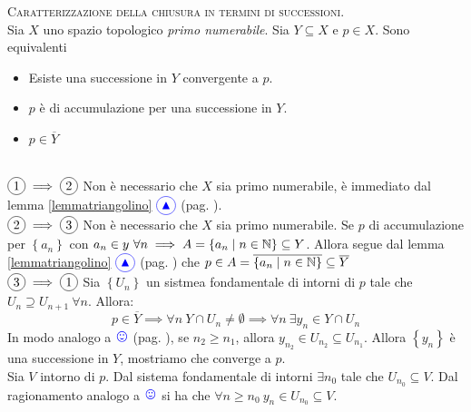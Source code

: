 \begin{proposition}
	\textsc{Caratterizzazione della chiusura in termini di successioni.}\\
	Sia $X$ uno spazio topologico \textit{primo numerabile}. Sia $Y\subseteq X$ e $p\in X$. Sono equivalenti
	\begin{itemize}
		\item Esiste una successione in $Y$ convergente a $p$.
		\item $p$ è di accumulazione per una successione in $Y$.
		\item $p\in \overline{Y}$
	\end{itemize}
\end{proposition}
\begin{demonstration}~{}\\
$\circled{1}\implies\circled{2}$ Non è necessario che $X$ sia primo numerabile, è immediato dal lemma \ref{lemmatriangolino} $\textcolor{blue}{\circled{{\large \blacktriangle}}}$ (pag. \pageref{lemmatriangolino}).\\
$\circled{2}\implies\circled{3}$ Non è necessario che $X$ sia primo numerabile. Se $p$ di accumulazione per $\left\{a_n\right\}$ con $a_n\in y\ \forall n\implies A=\left\{a_n\mid n\in \mathbb{N}\right\}\subseteq Y$. Allora segue dal lemma \ref{lemmatriangolino} $\textcolor{blue}{\circled{{\large \blacktriangle}}}$ (pag. \pageref{lemmatriangolino}) che $p\in A=\overline{\left\{a_n\mid n\in \mathbb{N}\right\}}\subseteq \overline{Y}$ \\
$\circled{3}\implies\circled{1}$ Sia $\left\{U_n\right\}$ un sistmea fondamentale di intorni di $p$ tale che $U_n\supseteq U_{n+1}\ \forall n$. Allora:
\begin{equation*}
	p\in \overline{Y}\implies \forall n\ Y\cap U_n\neq\emptyset\implies\forall n\ \exists y_n\in Y\cap U_n
\end{equation*}
In modo analogo a $\textcolor{blue}{{\large \smiley{}}}$ (pag. \pageref{notasorridente}), se $n_2\geq n_1$, allora $y_{n_2}\in U_{n_2}\subseteq U_{n_1}$. Allora $\left\{y_n\right\}$ è una successione in $Y$, mostriamo che converge a $p$.\\
Sia $V$ intorno di $p$. Dal sistema fondamentale di intorni $\exists n_0$ tale che $U_{n_0}\subseteq V$. Dal ragionamento analogo a $\textcolor{blue}{{\large \smiley{}}}$ si ha che $\forall n\geq n_0\ y_n\in U_{n_0}\subseteq V$.
\end{demonstration}
